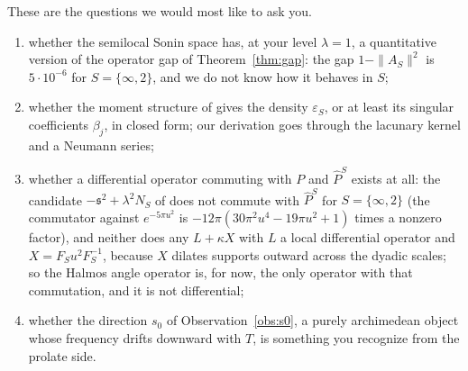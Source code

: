 \documentclass[11pt]{amsart}
\theoremstyle{definition}
\theoremstyle{remark}
\newcommand{\Pih}{\widehat P}
\begin{document}
These are the questions we would most like to ask you.
\begin{enumerate}
\item[(1)] whether the semilocal Sonin space has, at your level $\lambda=1$, a
quantitative version of the operator gap of Theorem~\ref{thm:gap}: the gap $1-\|A_S\|^2$ is $5\cdot10^{-6}$ for $S=\{\infty,2\}$,
and we do not know how it behaves in $S$;
\item[(2)] whether the moment structure of \cite{CCM2024} gives the density
$\varepsilon_S$, or at least its singular coefficients $\beta_j$, in closed form; our derivation goes through the lacunary kernel
and a Neumann series;
\item[(3)] whether a differential operator commuting with $P$ and $\Pih^S$ exists at all: the candidate
$-\mathfrak s^2+\lambda^2N_S$ of \cite{CCM2023} does not commute with $\Pih^S$ for $S=\{\infty,2\}$ (the commutator against
$e^{-5\pi u^2}$ is $-12\pi(30\pi^2u^4-19\pi u^2+1)$ times a nonzero factor), and neither does any $L+\kappa X$ with $L$ a local
differential operator and $X=F_Su^2F_S^{-1}$, because $X$ dilates supports outward across the dyadic scales; so the Halmos
angle operator is, for now, the only operator with that commutation, and it is not differential;
\item[(4)] whether the
direction $s_0$ of Observation~\ref{obs:s0}, a purely archimedean object whose frequency drifts downward with $T$, is something you
recognize from the prolate side.
\end{enumerate}
\end{document}
